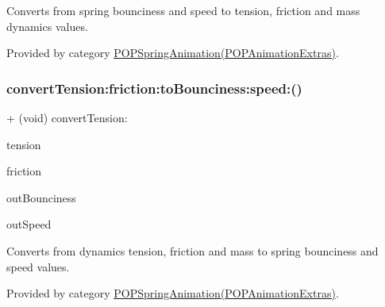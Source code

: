 Converts from spring bounciness and speed to tension, friction and mass dynamics values. 

Provided by category \mbox{\hyperlink{category_p_o_p_spring_animation_07_p_o_p_animation_extras_08_a64169073c5afd559e939783a7f3f4065}{P\+O\+P\+Spring\+Animation(\+P\+O\+P\+Animation\+Extras)}}.

\mbox{\label{interface_p_o_p_spring_animation_a6b5d0ffdb16b10c6de3575d9d45b831b}} 
\subsubsection{\texorpdfstring{convert\+Tension\+:friction\+:to\+Bounciness\+:speed\+:()}{convertTension:friction:toBounciness:speed:()}\hspace{0.1cm}{\footnotesize\ttfamily [1/3]}}
{\footnotesize\ttfamily + (void) convert\+Tension\+: \begin{DoxyParamCaption}\item[{(C\+G\+Float)}]{tension }\item[{friction:(C\+G\+Float)}]{friction }\item[{toBounciness:(C\+G\+Float $\ast$)}]{out\+Bounciness }\item[{speed:(C\+G\+Float $\ast$)}]{out\+Speed }\end{DoxyParamCaption}}

Converts from dynamics tension, friction and mass to spring bounciness and speed values. 

Provided by category \mbox{\hyperlink{category_p_o_p_spring_animation_07_p_o_p_animation_extras_08_a6b5d0ffdb16b10c6de3575d9d45b831b}{P\+O\+P\+Spring\+Animation(\+P\+O\+P\+Animation\+Extras)}}.

\mbox{\label{interface_p_o_p_spring_animation_a6b5d0ffdb16b10c6de3575d9d45b831b}} 
